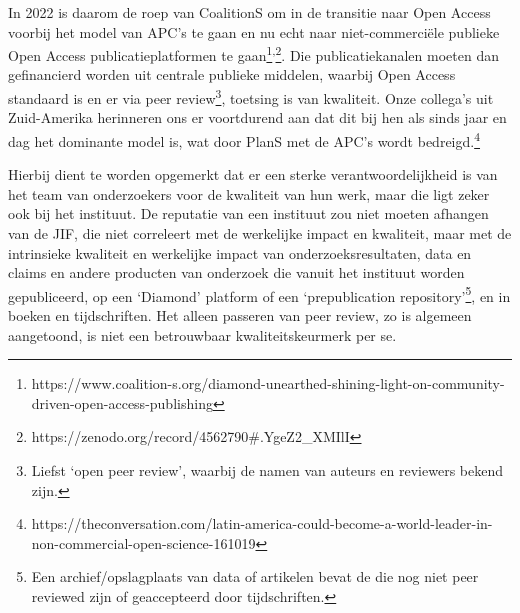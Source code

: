 \documentclass{jote-book}
\begin{document}
	In 2022 is daarom de roep van CoalitionS om in de transitie naar Open Access voorbij het model van APC's te gaan en nu echt naar niet-commerciële publieke Open Access publicatieplatformen te gaan\footnote{https://www.coalition-s.org/diamond-unearthed-shining-light-on-community-driven-open-access-publishing}\textsuperscript{,}\footnote{https://zenodo.org/record/4562790\#.YgeZ2\_XMIlI}. Die publicatiekanalen moeten dan gefinancierd worden uit centrale publieke middelen, waarbij Open Access standaard is en er via peer review\footnote{Liefst ‘open peer review', waarbij de namen van auteurs en reviewers bekend zijn.}, toetsing is van kwaliteit. Onze collega's uit Zuid-Amerika herinneren ons er voortdurend aan dat dit bij hen als sinds jaar en dag het dominante model is, wat door PlanS met de APC's wordt bedreigd.\footnote{https://theconversation.com/latin-america-could-become-a-world-leader-in-non-commercial-open-science-161019}



	Hierbij dient te worden opgemerkt dat er een sterke verantwoordelijkheid is van het team van onderzoekers voor de kwaliteit van hun werk, maar die ligt zeker ook bij het instituut. De reputatie van een instituut zou niet moeten afhangen van de JIF, die niet correleert met de werkelijke impact en kwaliteit, maar met de intrinsieke kwaliteit en werkelijke impact van onderzoeksresultaten, data en claims en andere producten van onderzoek die vanuit het instituut worden gepubliceerd, op een ‘Diamond' platform of een ‘prepublication repository'\footnote{Een archief/opslagplaats van data of artikelen bevat de die nog niet peer reviewed zijn of geaccepteerd door tijdschriften.}, en in boeken en tijdschriften. Het alleen passeren van peer review, zo is algemeen aangetoond, is niet een betrouwbaar kwaliteitskeurmerk per se.
\end{document}

